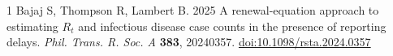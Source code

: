 \documentclass[11pt,a4paper]{article}
\begin{document}
\begin{thebibliography}{1}
Bajaj S, Thompson R, Lambert B. 2025
A renewal-equation approach to estimating $R_t$ and infectious disease case
counts in the presence of reporting delays.
\emph{Phil. Trans. R. Soc. A} \textbf{383}, 20240357.
\href{https://doi.org/10.1098/rsta.2024.0357}{doi:10.1098/rsta.2024.0357}
\end{thebibliography}
\end{document}
